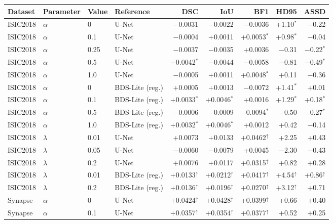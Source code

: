 \begin{tabular}{llllrrrrr}
\toprule
Dataset & Parameter & Value & Reference & DSC & IoU & BF1 & HD95 & ASSD \\
\midrule
ISIC2018 & $\alpha$ & 0 & U-Net & $-$0.0031 & $-$0.0022 & $-$0.0036 & +1.10$^{*}$ & $-$0.22 \\
ISIC2018 & $\alpha$ & 0.1 & U-Net & $-$0.0004 & +0.0011 & +0.0053$^{*}$ & +0.98$^{*}$ & $-$0.04 \\
ISIC2018 & $\alpha$ & 0.25 & U-Net & $-$0.0037 & $-$0.0035 & +0.0036 & $-$0.31 & $-$0.22$^{*}$ \\
ISIC2018 & $\alpha$ & 0.5 & U-Net & $-$0.0042$^{*}$ & $-$0.0044 & $-$0.0058 & $-$0.81 & $-$0.49$^{*}$ \\
ISIC2018 & $\alpha$ & 1.0 & U-Net & $-$0.0005 & +0.0011 & +0.0048$^{*}$ & +0.11 & $-$0.36 \\
ISIC2018 & $\alpha$ & 0 & BDS-Lite (reg.) & +0.0005 & +0.0013 & $-$0.0072 & +1.41$^{*}$ & +0.01 \\
ISIC2018 & $\alpha$ & 0.1 & BDS-Lite (reg.) & +0.0033$^{*}$ & +0.0046$^{*}$ & +0.0016 & +1.29$^{*}$ & +0.18$^{*}$ \\
ISIC2018 & $\alpha$ & 0.5 & BDS-Lite (reg.) & $-$0.0006 & $-$0.0009 & $-$0.0094$^{*}$ & $-$0.50 & $-$0.27$^{*}$ \\
ISIC2018 & $\alpha$ & 1.0 & BDS-Lite (reg.) & +0.0032$^{*}$ & +0.0046$^{*}$ & +0.0012 & +0.42 & $-$0.14 \\
ISIC2018 & $\lambda$ & 0.01 & U-Net & +0.0073 & +0.0133 & +0.0462$^{\uparrow}$ & +2.25 & +0.43 \\
ISIC2018 & $\lambda$ & 0.05 & U-Net & $-$0.0060 & $-$0.0079 & +0.0045 & $-$2.30 & $-$0.43 \\
ISIC2018 & $\lambda$ & 0.2 & U-Net & +0.0076 & +0.0117 & +0.0315$^{\uparrow}$ & +0.82 & +0.28 \\
ISIC2018 & $\lambda$ & 0.01 & BDS-Lite (reg.) & +0.0133$^{\uparrow}$ & +0.0212$^{\uparrow}$ & +0.0417$^{\uparrow}$ & +4.54$^{\uparrow}$ & +0.86$^{\uparrow}$ \\
ISIC2018 & $\lambda$ & 0.2 & BDS-Lite (reg.) & +0.0136$^{\uparrow}$ & +0.0196$^{\uparrow}$ & +0.0270$^{\uparrow}$ & +3.12$^{\uparrow}$ & +0.71 \\
Synapse & $\alpha$ & 0 & U-Net & +0.0424$^{\uparrow}$ & +0.0428$^{\uparrow}$ & +0.0399$^{\uparrow}$ & +0.66 & +0.40 \\
Synapse & $\alpha$ & 0.1 & U-Net & +0.0357$^{\uparrow}$ & +0.0354$^{\uparrow}$ & +0.0377$^{\uparrow}$ & +0.52 & +0.25 \\

\end{tabular}
